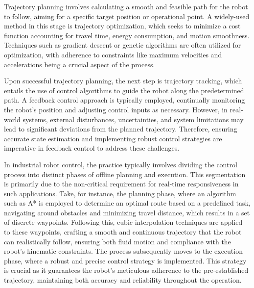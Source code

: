 Trajectory planning\cite{gasparetto2015path}\cite{gasparetto2012trajectory} involves calculating a smooth and feasible path for the robot to follow, aiming for a specific target position or operational point. A widely-used method in this stage is trajectory optimization\cite{betts1998survey}, which seeks to minimize a cost function accounting for travel time, energy consumption, and motion smoothness. Techniques such as gradient descent or genetic algorithms are often utilized for optimization, with adherence to constraints like maximum velocities and accelerations being a crucial aspect of the process.

Upon successful trajectory planning, the next step is trajectory tracking, which entails the use of control algorithms to guide the robot along the predetermined path. A feedback control approach is typically employed, continually monitoring the robot's position and adjusting control inputs as necessary. However, in real-world systems, external disturbances, uncertainties, and system limitations may lead to significant deviations from the planned trajectory. Therefore, ensuring accurate state estimation and implementing robust control strategies are imperative in feedback control to address these challenges.

In industrial robot control\cite{gasparetto2010optimal}, the practice typically involves dividing the control process into distinct phases of offline planning and execution. This segmentation is primarily due to the non-critical requirement for real-time responsiveness in such applications. Take, for instance, the planning phase, where an algorithm such as A* is employed to determine an optimal route based on a predefined task, navigating around obstacles and minimizing travel distance, which results in a set of discrete waypoints\cite{cui2011based}. Following this, cubic interpolation techniques are applied to these waypoints, crafting a smooth and continuous trajectory that the robot can realistically follow, ensuring both fluid motion and compliance with the robot's kinematic constraints\cite{bickley1968piecewise}. The process subsequently moves to the execution phase, where a robust and precise control strategy is implemented. This strategy is crucial as it guarantees the robot's meticulous adherence to the pre-established trajectory, maintaining both accuracy and reliability throughout the operation\cite{lynch2017modern}.

